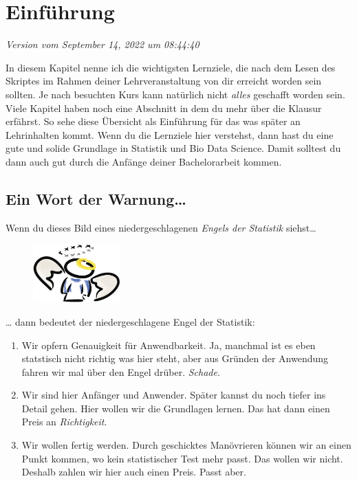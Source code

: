 \documentclass[
  letterpaper,
]{scrbook}
\providecommand{\tightlist}{%
  \setlength{\itemsep}{0pt}\setlength{\parskip}{0pt}}\usepackage{longtable,booktabs,array}
\begin{document}

\hypertarget{einfuxfchrung}{%
\chapter{Einführung}\label{einfuxfchrung}}

\emph{Version vom September 14, 2022 um 08:44:40}

In diesem Kapitel nenne ich die wichtigsten Lernziele, die nach dem
Lesen des Skriptes im Rahmen deiner Lehrveranstaltung von dir erreicht
worden sein sollten. Je nach besuchten Kurs kann natürlich nicht
\emph{alles} geschafft worden sein. Viele Kapitel haben noch eine
Abschnitt in dem du mehr über die Klausur erfährst. So sehe diese
Übersicht als Einführung für das was später an Lehrinhalten kommt. Wenn
du die Lernziele hier verstehst, dann hast du eine gute und solide
Grundlage in Statistik und Bio Data Science. Damit solltest du dann auch
gut durch die Anfänge deiner Bachelorarbeit kommen.

\hypertarget{ein-wort-der-warnung}{%
\section*{Ein Wort der Warnung\ldots{}}\label{ein-wort-der-warnung}}

Wenn du dieses Bild eines niedergeschlagenen \emph{Engels der Statistik}
siehst\ldots{}

\begin{figure}

{\centering \includegraphics[width=0.3\textwidth,height=\textheight]{./images/angel_01.png}

}

\end{figure}

\ldots{} dann bedeutet der niedergeschlagene Engel der Statistik:

\begin{enumerate}
\def\labelenumi{\arabic{enumi})}
\tightlist
\item
  Wir opfern Genauigkeit für Anwendbarkeit. Ja, manchmal ist es eben
  statstisch nicht richtig was hier steht, aber aus Gründen der
  Anwendung fahren wir mal über den Engel drüber. \emph{Schade}.
\item
  Wir sind hier Anfänger und Anwender. Später kannst du noch tiefer ins
  Detail gehen. Hier wollen wir die Grundlagen lernen. Das hat dann
  einen Preis an \emph{Richtigkeit}.
\item
  Wir wollen fertig werden. Durch geschicktes Manövrieren können wir an
  einen Punkt kommen, wo kein statistischer Test mehr passt. Das wollen
  wir nicht. Deshalb zahlen wir hier auch einen Preis. Passt aber.
\end{enumerate}
\end{document}
